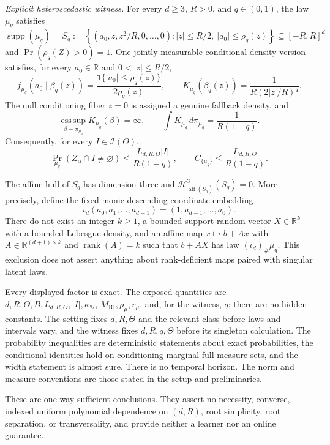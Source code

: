 \begin{theorem}
\emph{Explicit heteroscedastic witness.}
For every $d\geq3$, $R>0$, and $q\in(0,1)$, the law $\mu_q$ satisfies
\[
\operatorname{supp}(\mu_q)
=S_q:=\left\{(a_0,z,z^2/R,0,\ldots,0):
|z|\leq R/2,\ |a_0|\leq\rho_q(z)\right\}
\subseteq[-R,R]^d
\]
and $\Pr(\rho_q(Z)>0)=1$.  One jointly measurable conditional-density
version satisfies, for every $a_0\in\mathbb R$ and
$0<|z|\leq R/2$,
\[
f_{\mu_q}(a_0\mid\beta_q(z))
=\frac{\mathbf 1\{|a_0|\leq\rho_q(z)\}}{2\rho_q(z)},
\qquad
K_{\mu_q}(\beta_q(z))
=\frac{1}{R(2|z|/R)^q}.
\]
The null conditioning fiber $z=0$ is assigned a genuine fallback density,
and
\[
\operatorname*{ess\,sup}_{\beta\sim\pi_{\mu_q}}
K_{\mu_q}(\beta)=\infty,
\qquad
\int K_{\mu_q}\,d\pi_{\mu_q}=\frac{1}{R(1-q)}.
\]
Consequently, for every $I\in\mathscr I(\Theta)$,
\[
\Pr_{\mu_q}(Z_\alpha\cap I\neq\varnothing)
\leq\frac{L_{d,R,\Theta}|I|}{R(1-q)},
\qquad
C_{\{\mu_q\}}
\leq\frac{L_{d,R,\Theta}}{R(1-q)}.
\]

The affine hull of $S_q$ has dimension three and
$\mathcal H^3_{\operatorname{aff}(S_q)}(S_q)=0$.  More precisely, define
the fixed-monic descending-coordinate embedding
\[
\iota_d(a_0,a_1,\ldots,a_{d-1})
=(1,a_{d-1},\ldots,a_0).
\]
There do not exist an integer $k\geq1$, a bounded-support random vector
$X\in\mathbb R^k$ with a bounded Lebesgue density, and an affine map
$x\mapsto b+Ax$ with $A\in\mathbb R^{(d+1)\times k}$ and
$\operatorname{rank}(A)=k$ such that $b+AX$ has law
$(\iota_d)_\#\mu_q$.  This exclusion does not assert anything about
rank-deficient maps paired with singular latent laws.

Every displayed factor is exact.  The exposed quantities are
$d,R,\Theta,B,L_{d,R,\Theta},|I|,\bar\kappa_{\mathcal D}$,
$M_{\mathrm{RI}},\rho_\mu,r_\mu$, and, for the witness, $q$; there are no
hidden constants.  The setting fixes $d,R,\Theta$ and the relevant class
before laws and intervals vary, and the witness fixes $d,R,q,\Theta$
before its singleton calculation.  The probability inequalities are
deterministic statements about exact probabilities, the conditional
identities hold on conditioning-marginal full-measure sets, and the width
statement is almost sure.  There is no temporal horizon.  The norm and
measure conventions are those stated in the setup and preliminaries.

These are one-way sufficient conclusions.  They assert no necessity,
converse, indexed uniform polynomial dependence on $(d,R)$, root
simplicity, root separation, or transversality, and provide neither a
learner nor an online guarantee.
\end{theorem}

